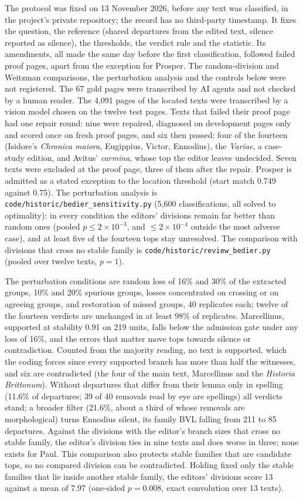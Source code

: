\documentclass[11pt,a4paper]{article}
\theoremstyle{remark}
\begin{document}
The protocol was fixed on 13 November 2026, before any text was classified, in the project's private repository; the record has no third-party timestamp. It fixes the question, the reference (shared departures from the edited text, silence reported as silence), the thresholds, the verdict rule and the statistic. Its amendments, all made the same day before the first classification, followed failed proof pages, apart from the exception for Prosper. The random-division and Weitzman comparisons, the perturbation analysis and the controls below were not registered. The 67 gold pages were transcribed by AI agents and not checked by a human reader. The 4{,}091 pages of the located texts were transcribed by a vision model chosen on the twelve test pages. Texts that failed their proof page had one repair round: nine were repaired, diagnosed on development pages only and scored once on fresh proof pages, and six then passed: four of the fourteen (Isidore's \emph{Chronica maiora}, Eugippius, Victor, Ennodius), the \emph{Variae}, a case-study edition, and Avitus' \emph{carmina}, whose top the editor leaves undecided. Seven texts were excluded at the proof page, three of them after the repair. Prosper is admitted as a stated exception to the location threshold (start match 0.749 against 0.75). The perturbation analysis is \texttt{code/historic/bedier\_sensitivity.py} (5{,}600 classifications, all solved to optimality): in every condition the editors' divisions remain far better than random ones (pooled $p\le2\times10^{-3}$, and $\le2\times10^{-4}$ outside the most adverse case), and at least five of the fourteen tops stay unresolved. The comparison with divisions that cross no stable family is \texttt{code/historic/review\_bedier.py} (pooled over twelve texts, $p=1$).

The perturbation conditions are random loss of 16\% and 30\% of the extracted groups, 10\% and 20\% spurious groups, losses concentrated on crossing or on agreeing groups, and restoration of missed groups, 40 replicates each; twelve of the fourteen verdicts are unchanged in at least 98\% of replicates. Marcellinus, supported at stability 0.91 on 219 units, falls below the admission gate under any loss of 16\%, and the errors that matter move tops towards silence or contradiction. Counted from the majority reading, no text is supported, which the coding forces since every supported branch has more than half the witnesses, and six are contradicted (the four of the main text, Marcellinus and the \emph{Historia Brittonum}). Without departures that differ from their lemma only in spelling (11.6\% of departures; 39 of 40 removals read by eye are spellings) all verdicts stand; a broader filter (21.6\%, about a third of whose removals are morphological) turns Ennodius silent, its family BVL falling from 211 to 85 departures. Against the divisions with the editor's branch sizes that cross no stable family, the editor's division ties in nine texts and does worse in three; none exists for Paul. This comparison also protects stable families that are candidate tops, so no compared division can be contradicted. Holding fixed only the stable families that lie inside another stable family, the editors' divisions score 13 against a mean of 7.97 (one-sided $p=0.008$, exact convolution over 13 texts).
\end{document}
